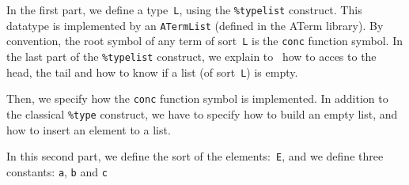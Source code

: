 \noindent
In the first part, we define a type~\texttt{L}, using the
\texttt{\%typelist} construct. This datatype is implemented by an
\texttt{ATermList} (defined in the ATerm library).
By convention, the root symbol of any term of sort~\texttt{L} is the
\texttt{conc} function symbol. In the last part of the
\texttt{\%typelist} construct, we explain to \TOM\ how to acces to the
head, the tail and how to know if a list (of sort~\texttt{L}) is
empty.


\noindent
Then, we specify how the \texttt{conc} function symbol is
implemented. In addition to the classical \texttt{\%type} construct,
we have to specify how to build an empty list, and how to insert an 
element to a list.


\noindent
In this second part, we define the sort of the elements:~\texttt{E},
and we define three constants: \texttt{a}, \texttt{b} and \texttt{c}


